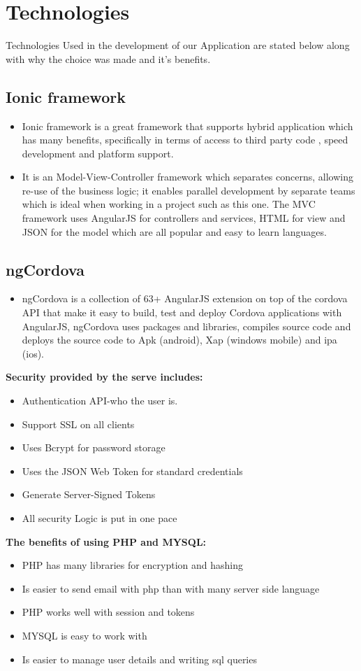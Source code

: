 \documentclass[a4paper,12pt]{article}
\begin{document}
\section{Technologies}
Technologies Used in the development of our Application are stated below along with why the choice was made and it's benefits.
\subsection{Ionic framework}
 \begin{itemize}
\item Ionic framework is a great framework that supports hybrid application which has many benefits, specifically in terms of access to third party code , speed development and  platform support.
\item It is an Model-View-Controller framework which separates concerns, allowing re-use of the business logic; it enables parallel development by separate teams which is ideal when working in a project such as this one.  The MVC framework uses AngularJS for controllers and services, HTML for view and JSON for the model which are all popular and easy to learn languages.
 \end{itemize}
\subsection{ngCordova}
\begin{itemize}
\item ngCordova is a collection of 63+ AngularJS extension on top of the cordova API that make it easy to build, test and deploy Cordova applications with AngularJS,  ngCordova uses packages and libraries, compiles source code and deploys the source code to Apk (android), Xap (windows mobile) and ipa (ios).
\end{itemize}
\textbf{Security provided by the serve includes:}
\begin{itemize}
\item Authentication API-who the user is.
\item Support SSL on all clients
\item Uses Bcrypt for password storage
\item Uses the JSON Web Token for standard credentials
\item Generate Server-Signed Tokens
\item All security Logic is put in one pace
\end{itemize}
 \textbf{The benefits of using PHP and MYSQL:}
\begin{itemize}
\item PHP has many libraries for encryption and hashing
\item Is easier to send email with php than with many server side language
\item PHP works well with session and tokens
\item MYSQL is easy to work with
\item Is easier to manage user details and writing sql queries 
\end{itemize}
\end{document}
